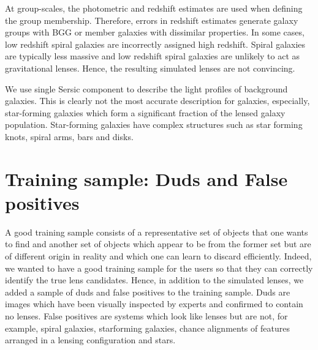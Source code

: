 \documentclass[useAMS,usenatbib,a4paper]{mn2e}
\begin{document}
At group-scales, the photometric and redshift estimates are used when
defining the group membership. Therefore, errors in redshift estimates generate
galaxy groups with BGG or member galaxies with dissimilar properties. In some
cases, low redshift spiral galaxies are incorrectly assigned high redshift.
Spiral galaxies are typically less massive and low redshift spiral galaxies are
unlikely to act as gravitational lenses. Hence, the resulting simulated lenses
are not convincing.

We use single Sersic component to describe the light profiles of background
galaxies. This is clearly not the most accurate description for galaxies,
especially, star-forming galaxies which form a significant fraction of the
lensed galaxy population. Star-forming galaxies have complex structures such as
star forming knots, spiral arms, bars and disks. 


%


\section{Training sample: Duds and False positives}
\label{sec:dfp}

A good training sample consists of a representative set of objects that
one wants to find and another set of objects which appear to be from the
former set but are of different origin in reality and which one can
learn to discard efficiently. Indeed, we wanted to have a good training
sample for the \sw users so that they can correctly identify the true
lens candidates. Hence, in addition to the simulated lenses, we
added a sample of duds and false positives to the training sample. Duds
are images which have been visually inspected by experts and confirmed
to contain no lenses.  False positives are systems which look like
lenses but are not, for example, spiral galaxies, starforming galaxies,
chance alignments of features arranged in a lensing configuration and
stars. 
\end{document}
